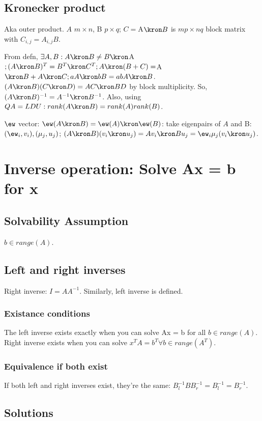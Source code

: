 \documentclass[oneside, article]{memoir}
\begin{document}
\subsection{Kronecker product}
Aka outer product. $A$ $m\times n$, B $p \times q$; $C = $A$ \kron B$ is $mp \times nq$ block matrix with $C_{i,j} = A_{i,j}B$.

From defn, $\exists A, B: A \kron B \neq B \kron $A$ ; (A \kron B)^{T} = B^{T} \kron C^{T}; A \kron (B+C) = $A$ \kron B + A \kron C; aA \kron bB = ab A\kron B$. $(A \kron B)(C \kron D) = AC \kron BD$ by block multiplicity. So, $(A \kron B)^{-1} = A^{-1} \kron B^{-1}$. Also, using $QA = LDU: rank(A \kron B) = rank(A)rank(B)$.

$\ew$ vector: $\ew(A \kron B) = \ew(A)\kron \ew(B)$: take eigenpairs of $A$ and B: \\$(\ew_{i}, v_{i}), (\mu_{j}, u_{j})$; 
$(A \kron B)(v_{i} \kron u_{j}) = Av_{i} \kron Bu_{j} = \ew_{i}\mu_{j}(v_{i} \kron u_{j})$.

\section{Inverse operation: Solve Ax = b for x}
\subsection{Solvability Assumption}
$b \in range(A)$.

\subsection{Left and right inverses}
Right inverse: $I=AA^{-1}$. Similarly, left inverse is defined.

\subsubsection{Existance conditions}
The left inverse exists exactly when you can solve Ax = b for all $b\in range(A)$. Right inverse exists when you can solve $x^{T}A = b^{T}  \forall b \in range(A^{T})$.

\subsubsection{Equivalence if both exist}
If both left and right inverses exist, they're the same: $B_{l}^{-1}BB_{r}^{-1} = B_{l}^{-1} = B_{r}^{-1}$.

\subsection{Solutions}
\end{document}
